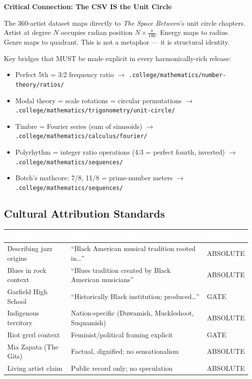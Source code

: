 \documentclass[11pt,letterpaper]{article}
\newcommand{\tblhdr}[1]{\textbf{\sffamily\textcolor{white}{#1}}}
\begin{document}
\begin{warnbox}
\textbf{\sffamily\textcolor{secondary}{Critical Connection: The CSV IS the Unit Circle}}

The 360-artist dataset maps directly to \textit{The Space Between}'s unit circle chapters.
Artist at degree $N$ occupies radian position $N \times \frac{\pi}{180}$. Energy maps to radius.
Genre maps to quadrant. This is not a metaphor --- it is structural identity.

\medskip
Key bridges that MUST be made explicit in every harmonically-rich release:
\begin{itemize}[leftmargin=1.5em,topsep=2pt]
  \item Perfect 5th = 3:2 frequency ratio $\rightarrow$ \texttt{.college/mathematics/number-theory/ratios/}
  \item Modal theory = scale rotations = circular permutations $\rightarrow$ \texttt{.college/mathematics/trigonometry/unit-circle/}
  \item Timbre = Fourier series (sum of sinusoids) $\rightarrow$ \texttt{.college/mathematics/calculus/fourier/}
  \item Polyrhythm = integer ratio operations (4:3 = perfect fourth, inverted) $\rightarrow$ \texttt{.college/mathematics/sequences/}
  \item Botch's mathcore: 7/8, 11/8 = prime-number meters $\rightarrow$ \texttt{.college/mathematics/sequences/}
\end{itemize}
\end{warnbox}

\subsection{Cultural Attribution Standards}

\begin{center}
\begin{tabularx}{\textwidth}{L{3.5cm}XL{2.5cm}}
\toprule
{}
\tblhdr{Situation} & \tblhdr{Required Language} & \tblhdr{Boundary} \\
\midrule
Describing jazz origins & ``Black American musical tradition rooted in\ldots'' & ABSOLUTE \\
Blues in rock context & ``Blues tradition created by Black American musicians'' & ABSOLUTE \\
Garfield High School & ``Historically Black institution; produced\ldots'' & GATE \\
Indigenous territory & Nation-specific (Duwamish, Muckleshoot, Suquamish) & ABSOLUTE \\
Riot grrrl context & Feminist/political framing explicit & GATE \\
Mia Zapata (The Gits) & Factual, dignified; no sensationalism & ABSOLUTE \\
Living artist claim & Public record only; no speculation & ABSOLUTE \\
\bottomrule
\end{tabularx}
\end{center}
\end{document}
